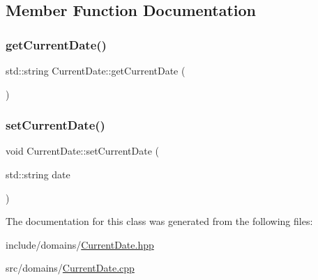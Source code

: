 \subsection{Member Function Documentation}
\mbox{\label{class_current_date_a8a58d6806adbdad8ce9741fc628bbcbf}} 
\subsubsection{\texorpdfstring{getCurrentDate()}{getCurrentDate()}}
{\footnotesize\ttfamily std\+::string Current\+Date\+::get\+Current\+Date (\begin{DoxyParamCaption}{ }\end{DoxyParamCaption})}

\mbox{\label{class_current_date_a01fbf35d387f69df1a16eb9899b5c9ab}} 
\subsubsection{\texorpdfstring{setCurrentDate()}{setCurrentDate()}}
{\footnotesize\ttfamily void Current\+Date\+::set\+Current\+Date (\begin{DoxyParamCaption}\item[{std\+::string}]{date }\end{DoxyParamCaption})}



The documentation for this class was generated from the following files\+:\begin{DoxyCompactItemize}
\item 
include/domains/\mbox{\hyperlink{_current_date_8hpp}{Current\+Date.\+hpp}}\item 
src/domains/\mbox{\hyperlink{_current_date_8cpp}{Current\+Date.\+cpp}}\end{DoxyCompactItemize}
